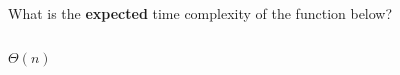 \begin{prob}
    What is the \textbf{expected} time complexity of the function below?

    \inputminted{python}{./code.py}

    \begin{soln}
        $\Theta(n)$
    \end{soln}

\end{prob}
